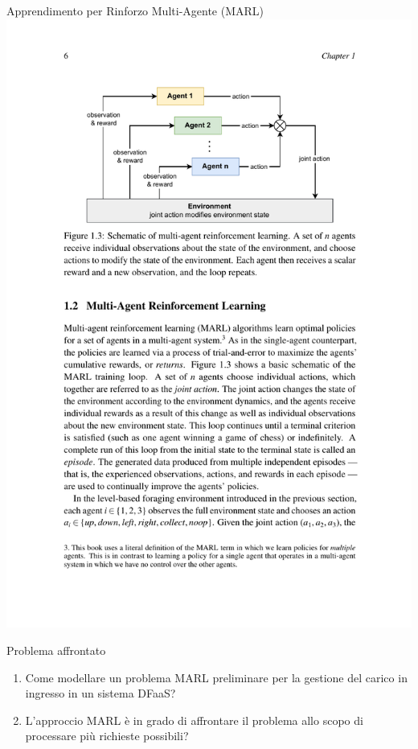 \documentclass[]{beamer}
\begin{document}
\begin{frame}{Apprendimento per Rinforzo Multi-Agente (MARL)}
    \centering
    \includegraphics[width=.9\textwidth]{assets/2/rl_multi_agent_schematic.pdf}
\end{frame}

\begin{frame}{Problema affrontato}
    \begin{enumerate}
        \item Come modellare un problema MARL preliminare per la gestione del carico in ingresso in un sistema DFaaS?

        \vspace{1cm}

        \item L'approccio MARL è in grado di affrontare il problema allo scopo di processare più richieste possibili?
    \end{enumerate}
\end{frame}
\end{document}
